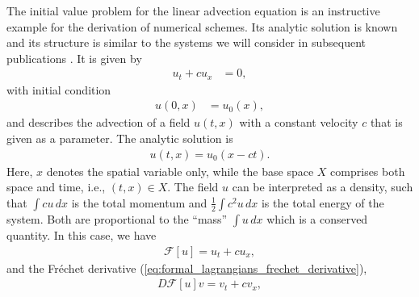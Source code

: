 \documentclass[12pt,a4paper,reqno]{article}
\begin{document}
The initial value problem for the linear advection equation is an instructive example for the derivation of numerical schemes.
Its analytic solution is known and its structure is similar to the systems we will consider in subsequent publications \cite{KrausMajSonnendruecker:2015, KrausSquireMaj:2015, KrausTassi:2015}.
It is given by
\begin{align}\label{eq:linear_advection_equation}
{\ensuremath{{\ensuremath{{u}}}}}_{t} + c {\ensuremath{{\ensuremath{{u}}}}}_{\ensuremath{{\ensuremath{{x}}}}} &= 0 ,
\end{align}
with initial condition
\begin{align}
{\ensuremath{{\ensuremath{{u}}}}} (0, {\ensuremath{{\ensuremath{{x}}}}}) &= {\ensuremath{{\ensuremath{{u}}}}}_{0} ({\ensuremath{{\ensuremath{{x}}}}}) ,
\end{align}
and describes the advection of a field ${\ensuremath{{\ensuremath{{u}}}}}({\ensuremath{{\ensuremath{{t}}}}}, {\ensuremath{{\ensuremath{{x}}}}})$ with a constant velocity $c$ that is given as a parameter.
The analytic solution is
\begin{align}
{\ensuremath{{\ensuremath{{u}}}}} ({\ensuremath{{\ensuremath{{t}}}}}, {\ensuremath{{\ensuremath{{x}}}}}) = {\ensuremath{{\ensuremath{{u}}}}}_{0} ({\ensuremath{{\ensuremath{{x}}}}} - c {\ensuremath{{\ensuremath{{t}}}}}) .
\end{align}
Here, ${\ensuremath{{\ensuremath{{x}}}}}$ denotes the spatial variable only, while the base space $X$ comprises both space and time, i.e., $({\ensuremath{{\ensuremath{{t}}}}}, {\ensuremath{{\ensuremath{{x}}}}}) \in X$.
The field $u$ can be interpreted as a density, such that $\int c {\ensuremath{{\ensuremath{{u}}}}} \, dx$ is the total momentum and $\tfrac{1}{2} \int c^{2} {\ensuremath{{\ensuremath{{u}}}}} \, d{\ensuremath{{\ensuremath{{x}}}}}$ is the total energy of the system. Both are proportional to the ``mass'' $\int {\ensuremath{{\ensuremath{{u}}}}} \, d{\ensuremath{{\ensuremath{{x}}}}}$ which is a conserved quantity.
In this case, we have
\begin{align}\label{eq:linear_advection_equation_operator}
\mathcal{F} [{\ensuremath{{\ensuremath{{u}}}}}] = {\ensuremath{{\ensuremath{{u}}}}}_{\ensuremath{{\ensuremath{{t}}}}} + c {\ensuremath{{\ensuremath{{u}}}}}_{\ensuremath{{\ensuremath{{x}}}}} ,
\end{align}
and the Fr\'{e}chet derivative (\ref{eq:formal_lagrangians_frechet_derivative}),
\begin{align}
D \mathcal{F} [{\ensuremath{{\ensuremath{{u}}}}}] {\ensuremath{{\ensuremath{{v}}}}} = {\ensuremath{{\ensuremath{{v}}}}}_{\ensuremath{{\ensuremath{{t}}}}} + c {\ensuremath{{\ensuremath{{v}}}}}_{\ensuremath{{\ensuremath{{x}}}}} ,
\end{align}
\end{document}
